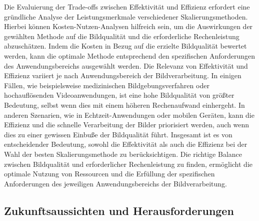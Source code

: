         
        Die Evaluierung der Trade-offs zwischen Effektivität und Effizienz erfordert eine gründliche Analyse der Leistungsmerkmale verschiedener Skalierungsmethoden. 
        Hierbei können Kosten-Nutzen-Analysen hilfreich sein, um die Auswirkungen der gewählten Methode auf die Bildqualität und die erforderliche Rechenleistung abzuschätzen. 
        Indem die Kosten in Bezug auf die erzielte Bildqualität bewertet werden, kann die optimale Methode entsprechend den spezifischen Anforderungen des Anwendungsbereichs ausgewählt werden.
        Die Relevanz von Effektivität und Effizienz variiert je nach Anwendungsbereich der Bildverarbeitung. 
        In einigen Fällen, wie beispielsweise medizinischen Bildgebungsverfahren oder hochauflösenden Videoanwendungen, ist eine hohe Bildqualität von größter Bedeutung, selbst wenn dies mit einem höheren Rechenaufwand einhergeht. 
        In anderen Szenarien, wie in Echtzeit-Anwendungen oder mobilen Geräten, kann die Effizienz und die schnelle Verarbeitung der Bilder priorisiert werden, auch wenn dies zu einer gewissen Einbuße der Bildqualität führt.
        Insgesamt ist es von entscheidender Bedeutung, sowohl die Effektivität als auch die Effizienz bei der Wahl der besten Skalierungsmethode zu berücksichtigen. 
        Die richtige Balance zwischen Bildqualität und erforderlicher Rechenleistung zu finden, ermöglicht die optimale Nutzung von Ressourcen und die Erfüllung der spezifischen Anforderungen des jeweiligen Anwendungsbereichs der Bildverarbeitung.

    \subsection{Zukunftsaussichten und Herausforderungen}
    
